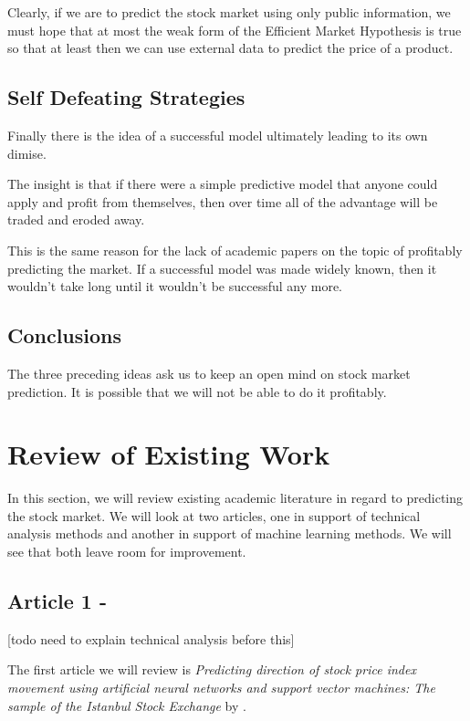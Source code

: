 \documentclass{report}
\begin{document}
Clearly, if we are to predict the stock market using only public information, we must hope that at most the weak form of the Efficient Market Hypothesis is true so that at least then we can use external data to predict the price of a product.

\section{Self Defeating Strategies}

Finally there is the idea of a successful model ultimately leading to its own dimise. 

The insight is that if there were a simple predictive model that anyone could apply and profit from themselves, then over time all of the advantage will be traded and eroded away.

This is the same reason for the lack of academic papers on the topic of profitably predicting the market. If a successful model was made widely known, then it wouldn't take long until it wouldn't be successful any more.

\section{Conclusions}

The three preceding ideas ask us to keep an open mind on stock market prediction. It is possible that we will not be able to do it profitably.

\chapter{Review of Existing Work}

In this section, we will review existing academic literature in regard to predicting the stock market. We will look at two articles, one in support of technical analysis methods and another in support of machine learning methods. We will see that both leave room for improvement.

\section{Article 1 - \citet{kara2011predicting}} 

[todo need to explain technical analysis before this]

The first article we will review is \textit{Predicting direction of stock price index movement using artificial neural networks and support vector machines: The sample of the Istanbul Stock Exchange} by \citet{kara2011predicting}. 
\end{document}
